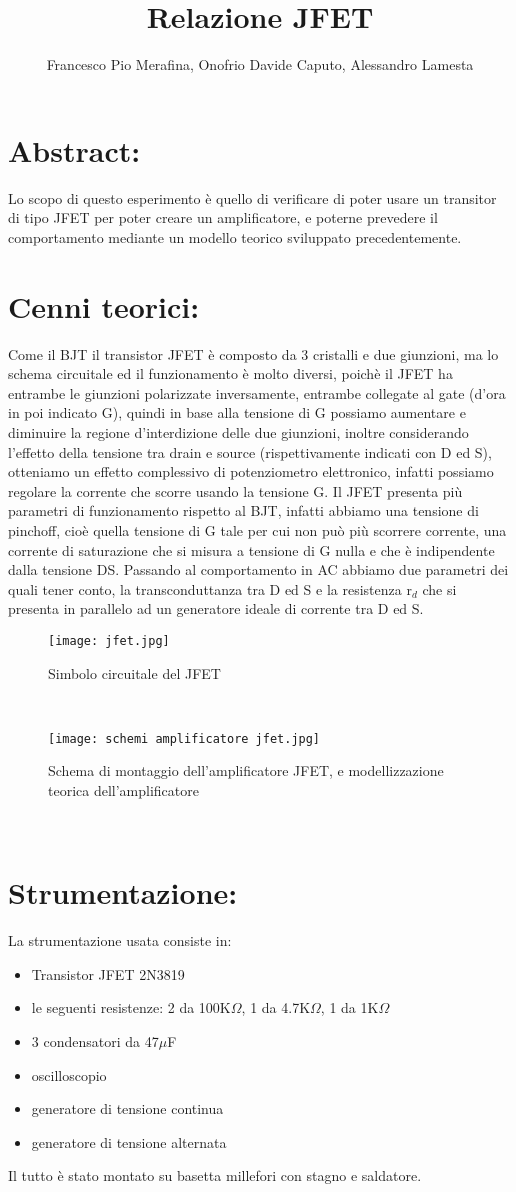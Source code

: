 \documentclass{article}
\title{Relazione JFET}
\author{Francesco Pio Merafina, Onofrio Davide Caputo, Alessandro Lamesta}
\begin{document}
\maketitle

\section{Abstract:}
Lo scopo di questo esperimento è quello di verificare di poter usare un transitor di tipo JFET per poter creare un amplificatore, e poterne prevedere il comportamento mediante un modello teorico sviluppato precedentemente.
~
\section{Cenni teorici:}
Come il BJT il transistor JFET è composto da 3 cristalli e due giunzioni, ma lo schema circuitale ed il funzionamento è molto diversi, poichè il JFET ha entrambe le giunzioni polarizzate inversamente, entrambe collegate al gate (d'ora in poi indicato G), quindi in base alla tensione di G possiamo aumentare e diminuire la regione d'interdizione delle due giunzioni, inoltre considerando l'effetto della tensione tra drain e source (rispettivamente indicati con D ed S), otteniamo un effetto complessivo di potenziometro elettronico, infatti possiamo regolare la corrente che scorre usando la tensione G. Il JFET presenta più parametri di funzionamento rispetto al BJT, infatti abbiamo una tensione di pinchoff, cioè quella tensione di G tale per cui non può più scorrere corrente, una corrente di saturazione che si misura a tensione di G nulla e che è indipendente dalla tensione DS. Passando al comportamento in AC abbiamo due parametri dei quali tener conto, la transconduttanza tra D ed S e la resistenza r$_{d}$ che si presenta in parallelo ad un generatore ideale di corrente tra D ed S.
~
\begin{figure}[h!]
    \centering
    \texttt{[image: jfet.jpg]} 
    \caption{Simbolo circuitale del JFET}
    \label{figura1}
\end{figure}
~
\begin{figure}[h!]
    \centering
    \texttt{[image: schemi amplificatore jfet.jpg]} 
    \caption{Schema di montaggio dell'amplificatore JFET, e modellizzazione teorica dell'amplificatore}
    \label{figura1}
\end{figure}
~
\section{Strumentazione:}
La strumentazione usata consiste in:
\begin{itemize}
    \item Transistor JFET 2N3819
    \item le seguenti resistenze: 2 da 100K$\Omega$, 1 da 4.7K$\Omega$, 1 da 1K$\Omega$
    \item 3 condensatori da 47$\mu$F
    \item oscilloscopio
    \item generatore di tensione continua
    \item generatore di tensione alternata
\end{itemize}
Il tutto è  stato montato su basetta millefori con stagno e saldatore.
~
\end{document}
